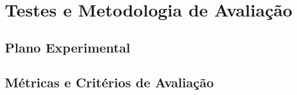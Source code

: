\chapter{Testes e Metodologia de Avalia\c{c}\~ao}
\label{chap:plano-experimental}

\section{Plano Experimental}
\label{sec:avaliacao-plano}

\section{M\'etricas e Crit\'erios de Avalia\c{c}\~ao}
\label{sec:avaliacao-metricas}
